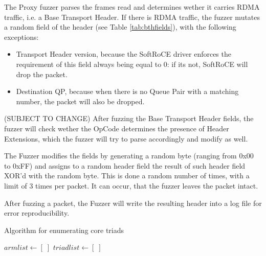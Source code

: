 The Proxy fuzzer parses the frames read and determines wether it carries RDMA traffic, i.e. a Base Transport Header.
If there is RDMA traffic, the fuzzer mutates a random field of the header (see Table \ref{tab:bthfields}), with the following exceptions:

\begin{itemize}
  \item Transport Header version, because the SoftRoCE driver enforces the requirement of this field always being equal to 0: if its not, SoftRoCE will drop the packet.
  \item Destination QP, because when there is no Queue Pair with a matching number, the packet will also be dropped.
\end{itemize}

(SUBJECT TO CHANGE)
After fuzzing the Base Transport Header fields, the fuzzer will check wether the OpCode determines the presence of Header Extensions,
which the fuzzer will try to parse accordingly and modify as well.

The Fuzzer modifies the fields by generating a random byte (ranging from 0x00 to 0xFF) and
assigns to a random header field the result of such header field XOR'd with the random byte. This is done a random number
of times, with a limit of 3 times per packet. It can occur, that the fuzzer leaves the packet intact.

After fuzzing a packet, the Fuzzer will write the resulting header into a log file for error reproducibility.


\SetAlgoVlined
\begin{algorithm}[t]
  \caption{Algorithm for enumerating core triads}
  \label{alg:triads}
  \LinesNumberedHidden
  \DontPrintSemicolon
  \BlankLine
  $armlist \longleftarrow [\;]$\;
  \BlankLine
  $triadlist \longleftarrow [\;]$\;
\end{algorithm}
